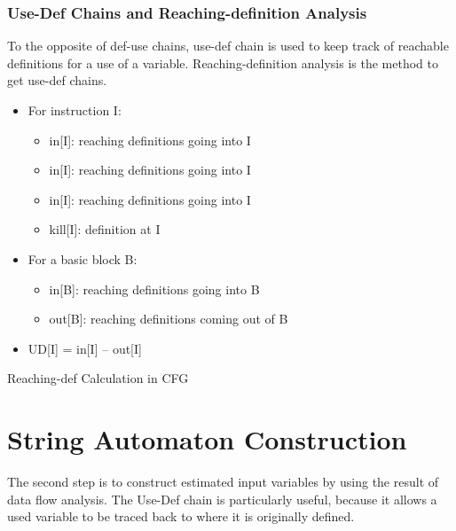 \subsubsection{Use-Def Chains and Reaching-definition Analysis}
To the opposite of def-use chains, use-def chain is used to keep track of reachable definitions for a use of a variable. Reaching-definition analysis is the method to get use-def chains.
\begin{itemize}
\item For instruction I:
\begin{itemize}
\item in[I]: reaching definitions going into I
\item in[I]: reaching definitions going into I
\item in[I]: reaching definitions going into I
\item kill[I]: definition at I
\end{itemize}
\item For a basic block B:
\begin{itemize}
\item in[B]: reaching definitions going into B
\item out[B]: reaching definitions coming out of B
\end{itemize}
\item UD[I] = in[I] – out[I]
\end{itemize}

\begin{algorithm}
\caption{Reaching-def Calculation in CFG}
\begin{algorithmic}
\EndFor
{}
	\EndFor
	\EndFor
\EndUntil
\end{algorithmic}
\end{algorithm}

\section{String Automaton Construction}
The second step is to construct estimated input variables by using the result of data flow analysis. The Use-Def chain is particularly useful, because it allows a used variable to be traced back to where it is originally defined.

